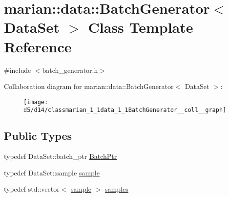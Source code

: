 \hypertarget{classmarian_1_1data_1_1BatchGenerator}{}\section{marian\+:\+:data\+:\+:Batch\+Generator$<$ Data\+Set $>$ Class Template Reference}
\label{classmarian_1_1data_1_1BatchGenerator}


{\ttfamily \#include $<$batch\+\_\+generator.\+h$>$}



Collaboration diagram for marian\+:\+:data\+:\+:Batch\+Generator$<$ Data\+Set $>$\+:
\nopagebreak
\begin{figure}[H]
\begin{center}
\leavevmode
\texttt{[image: d5/d14/classmarian\_1\_1data\_1\_1BatchGenerator\_\_coll\_\_graph]}
\end{center}
\end{figure}
\subsection*{Public Types}
\begin{DoxyCompactItemize}
\item 
typedef Data\+Set\+::batch\+\_\+ptr \hyperlink{classmarian_1_1data_1_1BatchGenerator_ae876f1ada46b7e7e3a4ea0ad45e9ee39}{Batch\+Ptr}
\item 
typedef Data\+Set\+::sample \hyperlink{classmarian_1_1data_1_1BatchGenerator_a6c7a80f1880a4ff6bfd3c99cef335855}{sample}
\item 
typedef std\+::vector$<$ \hyperlink{classmarian_1_1data_1_1BatchGenerator_a6c7a80f1880a4ff6bfd3c99cef335855}{sample} $>$ \hyperlink{classmarian_1_1data_1_1BatchGenerator_a38341de40649315f70f444529f4ec98e}{samples}
\end{DoxyCompactItemize}

